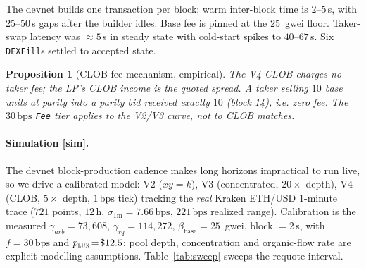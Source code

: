 \documentclass[11pt,a4paper]{article}
\newtheorem{proposition}{Proposition}[section]
\newcommand{\bps}{\,\text{bps}}
\begin{document}
The devnet builds one transaction per block; warm inter-block time is $2$--$5$\,s, with
$25$--$50$\,s gaps after the builder idles. Base fee is pinned at the $25$~gwei floor.
Taker-swap latency was $\approx\!5$\,s in steady state with cold-start spikes to
$40$--$67$\,s. Six \texttt{DEXFill}s settled to accepted state.

\begin{proposition}[CLOB fee mechanism, empirical]\label{prop:fee}
The V4 CLOB charges no taker fee; the LP's CLOB income is the quoted spread. A taker
selling $10$ base units at parity into a parity bid received exactly $10$ (block 14),
i.e. zero fee. The $30\bps$ \texttt{Fee} tier applies to the V2/V3 curve, not to CLOB
matches.
\end{proposition}

\paragraph{Simulation [sim].} The devnet block-production cadence makes long horizons
impractical to run live, so we drive a calibrated model: V2 ($xy{=}k$), V3 (concentrated,
$20\times$ depth), V4 (CLOB, $5\times$ depth, $1\bps$ tick) tracking the \emph{real}
Kraken ETH/USD $1$-minute trace ($721$ points, $12$\,h, $\sigma_{1\text{m}}\!=\!7.66\bps$,
$221\bps$ realized range). Calibration is the measured $\gamma_{arb}\!=\!73{,}608$,
$\gamma_{rq}\!=\!114{,}272$, $\beta_{\text{base}}\!=\!25$~gwei, block $=2$\,s, with
$f\!=\!30\bps$ and $p_{\textsc{lux}}\!=\!\$12.5$; pool depth, concentration and organic-flow
rate are explicit modelling assumptions. Table~\ref{tab:sweep} sweeps the requote interval.
\end{document}
